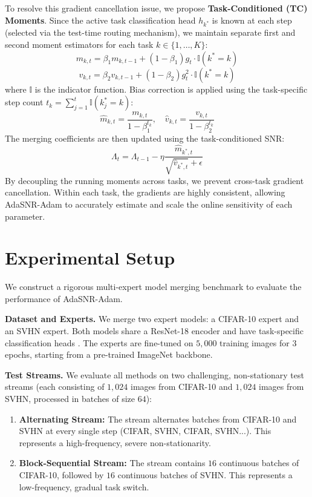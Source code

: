 \documentclass{article}
\theoremstyle{plain}
\theoremstyle{definition}
\theoremstyle{remark}
\begin{document}
To resolve this gradient cancellation issue, we propose \textbf{Task-Conditioned (TC) Moments}. Since the active task classification head $h_{k^*}$ is known at each step (selected via the test-time routing mechanism), we maintain separate first and second moment estimators for each task $k \in \{1, \dots, K\}$:
\begin{equation}
    m_{k, t} = \beta_1 m_{k, t-1} + (1 - \beta_1) g_t \cdot \mathbb{I}(k^* = k)
\end{equation}
\begin{equation}
    v_{k, t} = \beta_2 v_{k, t-1} + (1 - \beta_2) g_t^2 \cdot \mathbb{I}(k^* = k)
\end{equation}
where $\mathbb{I}$ is the indicator function. Bias correction is applied using the task-specific step count $t_k = \sum_{j=1}^t \mathbb{I}(k^*_j = k)$:
\begin{equation}
    \hat{m}_{k, t} = \frac{m_{k, t}}{1 - \beta_1^{t_k}}, \quad \hat{v}_{k, t} = \frac{v_{k, t}}{1 - \beta_2^{t_k}}
\end{equation}
The merging coefficients are then updated using the task-conditioned SNR:
\begin{equation}
    \Lambda_t = \Lambda_{t-1} - \eta \frac{\hat{m}_{k^*, t}}{\sqrt{\hat{v}_{k^*, t}} + \epsilon}
\end{equation}
By decoupling the running moments across tasks, we prevent cross-task gradient cancellation. Within each task, the gradients are highly consistent, allowing AdaSNR-Adam to accurately estimate and scale the online sensitivity of each parameter.

\section{Experimental Setup}
\label{sec:setup}
We construct a rigorous multi-expert model merging benchmark to evaluate the performance of AdaSNR-Adam.

\textbf{Dataset and Experts.} We merge two expert models: a CIFAR-10 expert and an SVHN expert. Both models share a ResNet-18 encoder \cite{he16resnet} and have task-specific classification heads \cite{yang23adamerging}. The experts are fine-tuned on $5,000$ training images for $3$ epochs, starting from a pre-trained ImageNet backbone.

\textbf{Test Streams.} We evaluate all methods on two challenging, non-stationary test streams (each consisting of $1,024$ images from CIFAR-10 and $1,024$ images from SVHN, processed in batches of size $64$):
\begin{enumerate}
    \item \textbf{Alternating Stream:} The stream alternates batches from CIFAR-10 and SVHN at every single step (CIFAR, SVHN, CIFAR, SVHN...). This represents a high-frequency, severe non-stationarity.
    \item \textbf{Block-Sequential Stream:} The stream contains $16$ continuous batches of CIFAR-10, followed by $16$ continuous batches of SVHN. This represents a low-frequency, gradual task switch.
\end{enumerate}
\end{document}
